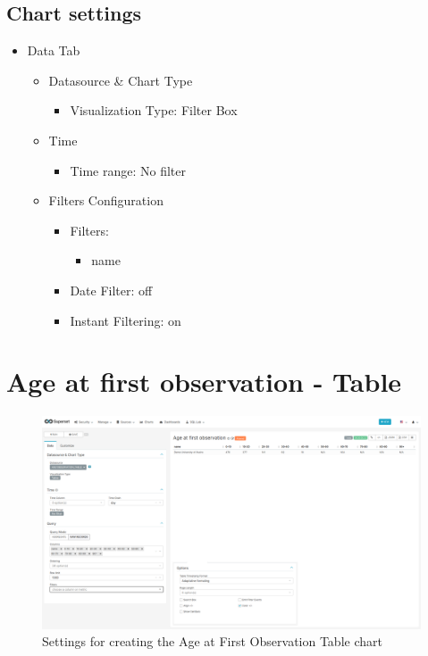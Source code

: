 \documentclass[
]{book}
\providecommand{\tightlist}{%
  \setlength{\itemsep}{0pt}\setlength{\parskip}{0pt}}
\begin{document}
\hypertarget{chart-settings-7}{%
\subsection{Chart settings}\label{chart-settings-7}}

\begin{itemize}
\item
  Data Tab

  \begin{itemize}
  \item
    Datasource \& Chart Type

    \begin{itemize}
    \tightlist
    \item
      Visualization Type: Filter Box
    \end{itemize}
  \item
    Time

    \begin{itemize}
    \tightlist
    \item
      Time range: No filter
    \end{itemize}
  \item
    Filters Configuration

    \begin{itemize}
    \item
      Filters:

      \begin{itemize}
      \tightlist
      \item
        name
      \end{itemize}
    \item
      Date Filter: off
    \item
      Instant Filtering: on
    \end{itemize}
  \end{itemize}
\end{itemize}

\hypertarget{age-at-first-observation---table}{%
\section{Age at first observation - Table}\label{age-at-first-observation---table}}

\begin{figure}
\includegraphics[width=1\linewidth]{images/04-person/02-age_at_first_observation_table} \caption{Settings for creating the Age at First Observation Table chart}\label{fig:ageFirstObservationTable}
\end{figure}
\end{document}
